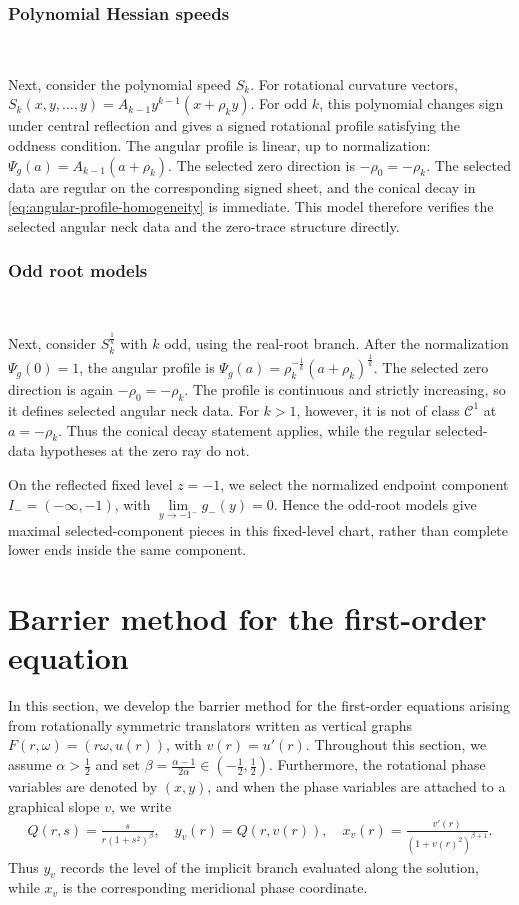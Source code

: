 \documentclass{amsart}
\theoremstyle{plain}
\theoremstyle{mainintrothm}
\theoremstyle{definition}
\begin{document}
	\subsubsection{Polynomial Hessian speeds}\,

	Next, consider the polynomial speed $S_k$.  For rotational curvature vectors,
	$S_k(x,y,\ldots,y)=A_{k-1}y^{k-1}(x+\rho_ky)$. For odd $k$, this polynomial changes sign under central reflection and gives
	a signed rotational profile satisfying the oddness condition.  The angular
	profile is linear, up to normalization: $\Psi_g(a)=A_{k-1}(a+\rho_k)$. The selected zero direction is $-\rho_0=-\rho_k$.  The selected data are regular
	on the corresponding signed sheet, and the conical decay in
	\eqref{eq:angular-profile-homogeneity} is immediate.  This model therefore
	verifies the selected angular neck data and the zero-trace structure directly.

	\subsubsection{Odd root models}\,

	Next, consider $S_k^{\frac{1}{k}}$ with $k$ odd, using the real-root branch.
	After the normalization $\Psi_g(0)=1$, the angular profile is $\Psi_g(a)=\rho_k^{-\frac{1}{k}}(a+\rho_k)^{\frac{1}{k}}$. The selected zero direction is again $-\rho_0=-\rho_k$.  The profile is
	continuous and strictly increasing, so it defines selected angular neck data.
	For $k>1$, however, it is not of class $\mathcal C^1$ at $a=-\rho_k$.  Thus the
	conical decay statement applies, while the regular selected-data hypotheses at
	the zero ray do not.

	\medskip

	On the reflected fixed level $z=-1$, we select the normalized endpoint component
    $I_-=(-\infty,-1)$, with  $\lim\limits_{y\to-1^-}g_-(y)=0$. Hence the odd-root models give maximal selected-component pieces in this
	fixed-level chart, rather than complete lower ends inside the same component.

	


\section{Barrier method for the first-order equation}
	\label{sec:barrier-method}
	
	In this section, we develop the barrier method for the first-order equations
	arising from rotationally symmetric translators written as vertical graphs
	$F(r,\omega)=(r\omega,u(r))$, with $v(r)=u'(r)$.  Throughout this section, we
	assume $\alpha>\frac{1}{2}$ and set $\beta=\frac{\alpha-1}{2\alpha}\in\left(-\frac{1}{2},\frac{1}{2}\right)$. Furthermore, the rotational phase variables are denoted by $(x,y)$, and  when the phase variables are attached to a graphical slope $v$, we write
	\begin{align*}
		Q(r,s)
		=
		\frac{s}{r(1+s^2)^\beta},
		\quad
		y_v(r)
		=
		Q(r,v(r)),
		\quad
		x_v(r)
		=
		\frac{v'(r)}{(1+v(r)^2)^{\beta+1}}.
	\end{align*}
	Thus $y_v$ records the level of the implicit branch evaluated along the
	solution, while $x_v$ is the corresponding meridional phase coordinate.
	
\end{document}

